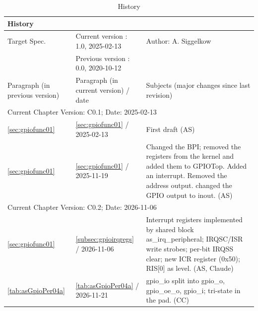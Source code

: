 \begin{table}[H]
\caption{History}
\label{tab:gpiohistory02}
\centering
\begin{tabularx}{\textwidth}{|X |X |X |}
  \hline
  \multicolumn{3}{|l|}{History} \\
  \hline
  \multicolumn{1}{|l}{Target Spec.} & \multicolumn{1}{l}{Current version : 1.0, 2025-02-13} & \multicolumn{1}{l|}{Author: A. Siggelkow}\\
  \multicolumn{1}{|l}{ } & \multicolumn{1}{l}{Previous version : 0.0, 2020-10-12} & \multicolumn{1}{l|}{ }\\
  \hline
  \hline
  Paragraph (in previous version) & Paragraph (in current version) / date & Subjects (major changes since last revision) \\
  \hline
  \hline
  \multicolumn{3}{|l|}{Current Chapter Version: C0.1; Date: 2025-02-13} \\
  \hline
  \ref{sec:gpiofunc01} & \ref{sec:gpiofunc01} / 2025-02-13 & First draft (AS) \\
  \hline
  \ref{sec:gpiofunc01} & \ref{sec:gpiofunc01} / 2025-11-19 & Changed the BPI; removed the registers from the kernel and added them to GPIOTop. Added an interrupt. Removed the address output. changed the GPIO output to inout. (AS) \\
  \hline
  \multicolumn{3}{|l|}{Current Chapter Version: C0.2; Date: 2026-11-06} \\
  \hline
  \ref{sec:gpiofunc01} & \ref{subsec:gpioirqregs} / 2026-11-06 & Interrupt registers implemented by shared block as\_irq\_peripheral; IRQSC/ISR write strobes; per-bit IRQSS clear; new ICR register (0x50); RIS[0] as level. (AS, Claude) \\
  \hline
  \ref{tab:asGpioPer04a} & \ref{tab:asGpioPer04a} / 2026-11-21 & gpio\_io split into gpio\_o, gpio\_oe\_o, gpio\_i; tri-state in the pad. (CC) \\
  \hline
\end{tabularx}
\end{table}
